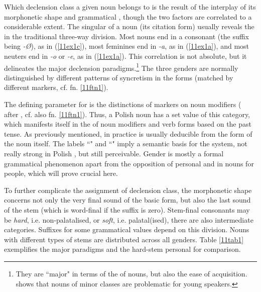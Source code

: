\documentclass[output=paper,colorlinks,citecolor=brown]{langscibook}
\begin{document}
Which declension class a given noun belongs to is the result of the interplay of its morphonetic shape and grammatical , though the two factors are correlated to a considerable extent. The  singular of a noun (its citation form) usually reveals the  in the traditional three-way division. Most  nouns end in a consonant (the suffix being \emph{-Ø}), as in (\ref{11ex1c}), most feminines end in \emph{-a}, as in (\ref{11ex1a}), and most neuters end in \emph{-o} or \emph{-e}, as in (\ref{11ex1a}). This correlation is not absolute, but it delineates the major declension paradigms.\footnote{They are ``major" in terms of the  of nouns, but also the ease of acquisition. \citet[625--626]{smoczynska1985} shows that nouns of minor classes are problematic for young speakers.} The three  genders are normally distinguished by different patterns of syncretism in the  forms (matched by different  markers, cf. fn. \ref{11ftn1}).

The defining parameter for  is the distinctions of  markers on noun modifiers (\citealt[231]{hockett1958} after \citealt[1]{corbett1991}, cf. also fn. \ref{11ftn1}). Thus, a Polish noun has a set value of this category, which manifests itself in the  of noun modifiers and verb forms based on the past tense. As previously mentioned, in practice  is usually deducible from the form of the noun itself. The labels ``" and ``" imply a semantic basis for the  system, not really strong in Polish \citep[175]{kucala1978}, but still perceivable. Gender is mostly a formal grammatical phenomenon apart from the opposition of  personal and  in nouns for people, which will prove crucial here.

To further complicate the assignment of declension class, the morphonetic shape concerns not only the very final sound of the basic form, but also the last sound of the stem (which is word-final if the suffix is zero). Stem-final consonants may be \textit{hard}, i.e. non-palatalised, or \textit{soft}, i.e. palatal(ised), there are also intermediate categories. Suffixes for some grammatical values depend on this division. Nouns with different types of stems are distributed across all genders. Table \ref{11tab1} exemplifies the major  paradigms and the hard-stem  personal  for comparison.
\end{document}
